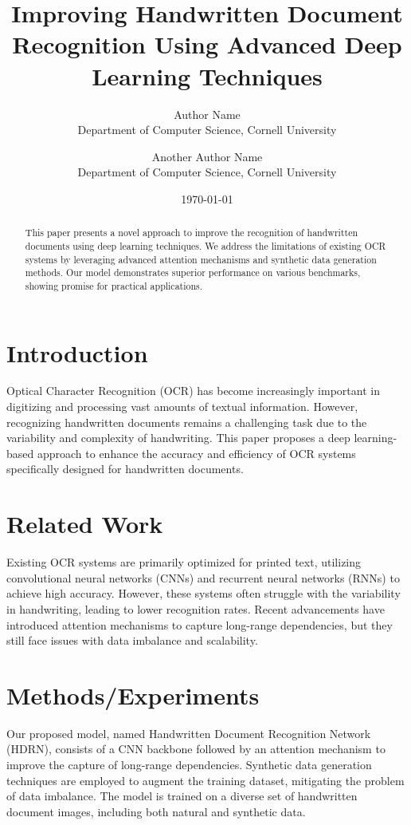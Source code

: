 \documentclass{article}
\title{Improving Handwritten Document Recognition Using Advanced Deep Learning Techniques}
\author{Author Name \\
Department of Computer Science, Cornell University \\
\and Another Author Name \\
Department of Computer Science, Cornell University}
\date{\today}
\begin{document}
\maketitle

\begin{abstract}
This paper presents a novel approach to improve the recognition of handwritten documents using deep learning techniques. We address the limitations of existing OCR systems by leveraging advanced attention mechanisms and synthetic data generation methods. Our model demonstrates superior performance on various benchmarks, showing promise for practical applications.
\end{abstract}

\section{Introduction}
Optical Character Recognition (OCR) has become increasingly important in digitizing and processing vast amounts of textual information. However, recognizing handwritten documents remains a challenging task due to the variability and complexity of handwriting. This paper proposes a deep learning-based approach to enhance the accuracy and efficiency of OCR systems specifically designed for handwritten documents.

\section{Related Work}
Existing OCR systems are primarily optimized for printed text, utilizing convolutional neural networks (CNNs) and recurrent neural networks (RNNs) to achieve high accuracy. However, these systems often struggle with the variability in handwriting, leading to lower recognition rates. Recent advancements have introduced attention mechanisms to capture long-range dependencies, but they still face issues with data imbalance and scalability.

\section{Methods/Experiments}
Our proposed model, named Handwritten Document Recognition Network (HDRN), consists of a CNN backbone followed by an attention mechanism to improve the capture of long-range dependencies. Synthetic data generation techniques are employed to augment the training dataset, mitigating the problem of data imbalance. The model is trained on a diverse set of handwritten document images, including both natural and synthetic data.
\end{document}
